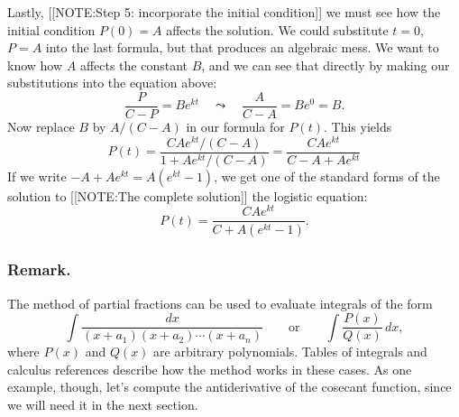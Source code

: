 Lastly, 
[[NOTE:Step 5: incorporate  the initial condition]]
we must see how the initial condition $P(0) = A$ affects the solution.
We could substitute $t = 0$, $P = A$ into the last formula, but that
produces an algebraic mess.  
\pagebreak
We want to know how $A$ affects the constant $B$, and we can see that
directly by making our substitutions into the equation above:
	\[
\dfrac{P}{C - P} = Be^{kt} \quad \leadsto \quad
		\dfrac{A}{C - A} = Be^0 = B.
\]
Now replace $B$ by $A/(C - A)$ in our formula for $P(t)$.  This yields
	\[
P(t) = \dfrac{CAe^{kt}/(C - A)}{1 + Ae^{kt}/(C - A)} =
		\dfrac{CAe^{kt}}{C - A + Ae^{kt}}
\]
If we write $-A + Ae^{kt} = A(e^{kt} - 1)$, we get one of the standard
forms of the solution to 
[[NOTE:The complete solution]]
the logistic equation: 
	\[
P(t) = \dfrac{CAe^{kt}}{C + A(e^{kt} - 1)}.
\]


\subsubsection{Remark.}
The method of partial fractions can be used to evaluate integrals of the form
	\[
\int \dfrac{dx}{(x + a_1) (x + a_2) \cdots (x + a_n)} \qquad 
	\mbox{or} \qquad \int \dfrac{P(x)}{Q(x)} \, dx,
\]
where $P(x)$ and $Q(x)$ are arbitrary polynomials.  Tables of
integrals and calculus references describe how the method works in
these cases.  As one example, though, let's compute the antiderivative
of the cosecant function, since we will need it in the next section.





